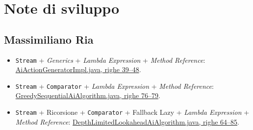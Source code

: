 \section{Note di sviluppo}

\subsection{Massimiliano Ria}

\begin{itemize}
    \item \texttt{Stream} + \textit{Generics} + \textit{Lambda Expression} + \textit{Method Reference}: \href{https://github.com/MassimilianoRia/OOP25-MassimilianoRia-SimoneMarsili-FrancescoDama-LorenzoMercuriali-HearthCode/blob/ad762040c1d12b7b424ce558a19d3ee38d20870c/src/main/java/it/unibo/oop/hearthcode/model/ai/action/impl/AiActionGeneratorImpl.java#L39-L48}
    {AiActionGeneratorImpl.java, righe 39--48}.
    \item \texttt{Stream} + \texttt{Comparator} + \textit{Lambda Expression} + \textit{Method Reference}: \href{https://github.com/MassimilianoRia/OOP25-MassimilianoRia-SimoneMarsili-FrancescoDama-LorenzoMercuriali-HearthCode/blob/ad762040c1d12b7b424ce558a19d3ee38d20870c/src/main/java/it/unibo/oop/hearthcode/model/ai/algorithm/impl/GreedySequentialAiAlgorithm.java#L76-L79}
    {GreedySequentialAiAlgorithm.java, righe 76--79}.
    \item \texttt{Stream} + Ricorsione + \texttt{Comparator} + Fallback Lazy + \textit{Lambda Expression} + \textit{Method Reference}: \href{https://github.com/MassimilianoRia/OOP25-MassimilianoRia-SimoneMarsili-FrancescoDama-LorenzoMercuriali-HearthCode/blob/ad762040c1d12b7b424ce558a19d3ee38d20870c/src/main/java/it/unibo/oop/hearthcode/model/ai/algorithm/impl/DepthLimitedLookaheadAiAlgorithm.java#L64-L85}
    {DepthLimitedLookaheadAiAlgorithm.java, righe 64--85}.
    

\end{itemize}
